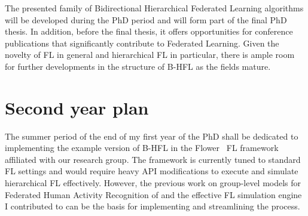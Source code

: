 
The presented family of Bidirectional Hierarchical Federated Learning algorithms will be developed during the PhD period and will form part of the final PhD thesis. In addition, before the final thesis, it offers opportunities for conference publications that significantly contribute to Federated Learning. Given the novelty of FL in general and hierarchical FL in particular, there is ample room for further developments in the structure of B-HFL as the fields mature.

\section{Second year plan}

The summer period of the end of my first year of the PhD shall be dedicated to implementing the example version of B-HFL in the Flower~\citep{Flower} FL framework affiliated with our research group. The framework is currently tuned to standard FL settings and would require heavy API modifications to execute and simulate hierarchical FL effectively. However, the previous work on group-level models for Federated Human Activity Recognition of \citet{OperaWorkshop} and the effective FL simulation engine I contributed to can be the basis for implementing and streamlining the process.

